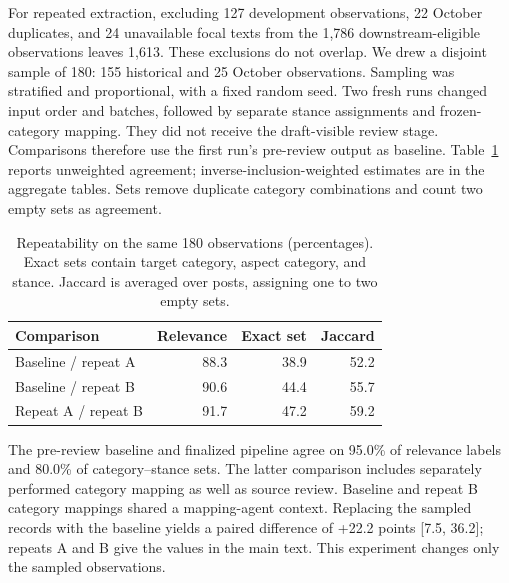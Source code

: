 \documentclass[sigconf,balance=false]{acmart}
\begin{document}
For repeated extraction, excluding 127 development observations, 22 October duplicates, and 24 unavailable focal texts from the 1,786 downstream-eligible observations leaves 1,613. These exclusions do not overlap. We drew a disjoint sample of 180: 155 historical and 25 October observations. Sampling was stratified and proportional, with a fixed random seed. Two fresh runs changed input order and batches, followed by separate stance assignments and frozen-category mapping. They did not receive the draft-visible review stage. Comparisons therefore use the first run's pre-review output as baseline. Table~\ref{tab:repeat} reports unweighted agreement; inverse-inclusion-weighted estimates are in the aggregate tables. Sets remove duplicate category combinations and count two empty sets as agreement.

\begin{table}[tp]
\caption{Repeatability on the same 180 observations (percentages). Exact sets contain target category, aspect category, and stance. Jaccard is averaged over posts, assigning one to two empty sets.}
\label{tab:repeat}
\centering
\begin{tabular}{lrrr}
\toprule Comparison & Relevance & Exact set & Jaccard\\
\midrule
Baseline / repeat A & 88.3 & 38.9 & 52.2\\
Baseline / repeat B & 90.6 & 44.4 & 55.7\\
Repeat A / repeat B & 91.7 & 47.2 & 59.2\\
\bottomrule
\end{tabular}
\end{table}

The pre-review baseline and finalized pipeline agree on 95.0\% of relevance labels and 80.0\% of category--stance sets. The latter comparison includes separately performed category mapping as well as source review. Baseline and repeat B category mappings shared a mapping-agent context. Replacing the sampled records with the baseline yields a paired difference of +22.2 points [7.5, 36.2]; repeats A and B give the values in the main text. This experiment changes only the sampled observations.

%
\begin{table}[!htbp]
\small
\setlength{\tabcolsep}{2pt}

\end{table}
\end{document}
